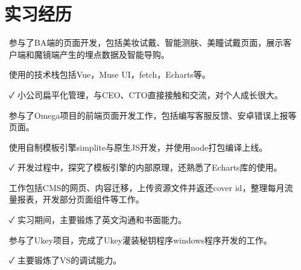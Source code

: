 \documentclass[14pt]{resume}
\begin{document}
\section{\faBriefcase\ 实习经历}

\begin{itemize}
    \item[\faFlagO] 参与了BA端的页面开发，包括美妆试戴、智能测肤、美瞳试戴页面，展示客户端和魔镜端产生的埋点数据及智能导购。
    \item[\faCode] 使用的技术栈包括Vue，Muse UI，fetch，Echarts等。
    \item[\faCheck] 小公司扁平化管理，与CEO、CTO直接接触和交流，对个人成长很大。
\end{itemize}


\begin{itemize}
    \item[\faFlagO] 参与了Omega项目的前端页面开发工作，包括编写客服反馈、安卓错误上报等页面。
    \item[\faCode] 使用自制模板引擎simplite与原生JS开发，并使用node打包编译上线。
    \item[\faCheck] 开发过程中，探究了模板引擎的内部原理，还熟悉了Echarts库的使用。
\end{itemize}

\begin{itemize}
    \item[\faFlagO] 工作包括CMS的网页、内容迁移，上传资源文件并返还cover id，整理每月流量报表，开发部分页面组件等工作。
    \item[\faCheck] 实习期间，主要锻炼了英文沟通和书面能力。
\end{itemize}

\begin{itemize}
    \item[\faFlagO] 参与了Ukey项目，完成了Ukey灌装秘钥程序windows程序开发的工作。
    \item[\faCheck] 主要锻炼了VS的调试能力。
\end{itemize}
\end{document}

